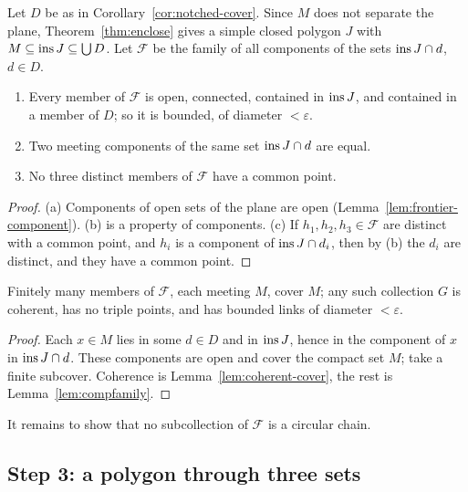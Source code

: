 Let $D$ be as in Corollary~\ref{cor:notched-cover}. Since $M$ does not separate the plane,
Theorem~\ref{thm:enclose} gives a simple closed polygon $J$ with $M\subseteq\operatorname{ins} J\subseteq\bigcup D$.
Let $\mathcal F$ be the family of all components of the sets $\operatorname{ins} J\cap d$, $d\in D$.

\begin{lemma}\label{lem:compfamily}
\begin{enumerate}[label=(\alph*)]
\item Every member of $\mathcal F$ is open, connected, contained in $\operatorname{ins} J$, and contained in a member
of $D$; so it is bounded, of diameter $<\varepsilon$.
\item Two meeting components of the same set $\operatorname{ins} J\cap d$ are equal.
\item No three distinct members of $\mathcal F$ have a common point.
\end{enumerate}
\end{lemma}

\begin{proof}
(a) Components of open sets of the plane are open (Lemma~\ref{lem:frontier-component}). (b) is a
property of components. (c) If $h_1,h_2,h_3\in\mathcal F$ are distinct with a common point, and $h_i$
is a component of $\operatorname{ins} J\cap d_i$, then by (b) the $d_i$ are distinct, and they have a common point.
\end{proof}


\begin{lemma}\label{lem:cover-links}
Finitely many members of $\mathcal F$, each meeting $M$, cover $M$; any such collection $G$ is
coherent, has no triple points, and has bounded links of diameter $<\varepsilon$.
\end{lemma}

\begin{proof}
Each $x\in M$ lies in some $d\in D$ and in $\operatorname{ins} J$, hence in the component of $x$ in $\operatorname{ins} J\cap d$.
These components are open and cover the compact set $M$; take a finite subcover. Coherence is
Lemma~\ref{lem:coherent-cover}, the rest is Lemma~\ref{lem:compfamily}.
\end{proof}

It remains to show that no subcollection of $\mathcal F$ is a circular chain.

\subsection*{Step 3: a polygon through three sets}

